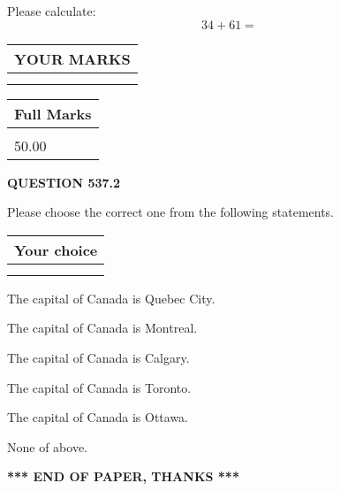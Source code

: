 \documentclass[12pt]{article}
\begin{document}
  
 
Please calculate:
\begin{equation}
34 +  %
61 = \nonumber
\end{equation}
 

 

 
  
\vspace{0.2in}
  
\noindent\begin{tabular}{|l|}
\hline
 YOUR MARKS  \\
\hline
 \\ 
 \\ 
\hline
\end{tabular}
\hspace{0.05in} \begin{tabular}{|l|}
\hline
 Full Marks  \\
\hline
 \\ 
50.00 \\
\hline
\end{tabular}
{\textbf{\Large{QUESTION
537.2 
}}}
  
  
Please choose the correct one from the following statements.
  
  
\noindent\hspace{3.0in} \begin{tabular}{|l|}
\hline
Your choice \\
\hline
 \\ 
 \\ 
\hline
\end{tabular}
  
  
 
 
The capital of Canada is Quebec City.
 
 
The capital of Canada is Montreal.
 
 
The capital of Canada is Calgary.
 
 
The capital of Canada is Toronto.
 
 
The capital of Canada is Ottawa.
 
 
 None of above.
 
 
   
   
 \vspace{0.2in}
 
   
   
   
   
\vspace{1.0in} 
{\textbf{\large{ *** END OF PAPER, THANKS *** }}} 
   
\end{document}

